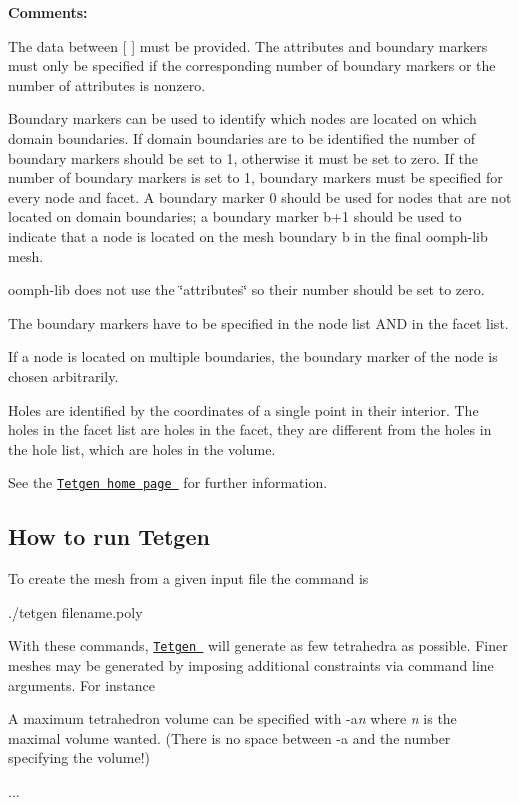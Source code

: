 {\bfseries Comments\+:} 
\begin{DoxyItemize}
\item The data between \mbox{[} \mbox{]} must be provided. The attributes and boundary markers must only be specified if the corresponding number of boundary markers or the number of attributes is nonzero. ~\newline
 ~\newline

\item Boundary markers can be used to identify which nodes are located on which domain boundaries. If domain boundaries are to be identified the number of boundary markers should be set to 1, otherwise it must be set to zero. If the number of boundary markers is set to 1, boundary markers must be specified for every node and facet. A boundary marker 0 should be used for nodes that are not located on domain boundaries; a boundary marker {\ttfamily b+1} should be used to indicate that a node is located on the mesh boundary {\ttfamily b} in the final {\ttfamily oomph-\/lib} mesh.
\item {\ttfamily oomph-\/lib} does not use the \char`\"{}attributes\char`\"{} so their number should be set to zero.
\item The boundary markers have to be specified in the node list A\+ND in the facet list.
\item If a node is located on multiple boundaries, the boundary marker of the node is chosen arbitrarily.
\item Holes are identified by the coordinates of a single point in their interior. The holes in the facet list are holes in the facet, they are different from the holes in the hole list, which are holes in the volume.
\end{DoxyItemize}

See the \href{http://wias-berlin.de/software/tetgen//}{\tt {\ttfamily Tetgen} home page } for further information.



\hypertarget{index_run_Tetgen}{}\subsection{How to run Tetgen}\label{index_run_Tetgen}
To create the mesh from a given input file the command is 
\begin{DoxyCode}
./tetgen filename.poly
\end{DoxyCode}


With these commands, \href{http://wias-berlin.de/software/tetgen//}{\tt {\ttfamily Tetgen} } will generate as few tetrahedra as possible. Finer meshes may be generated by imposing additional constraints via command line arguments. For instance
\begin{DoxyItemize}
\item A maximum tetrahedron volume can be specified with {\ttfamily -\/a}{\itshape n} where {\itshape n} is the maximal volume wanted. (There is no space between {\ttfamily -\/a} and the number specifying the volume!)
\item ...
\end{DoxyItemize}


